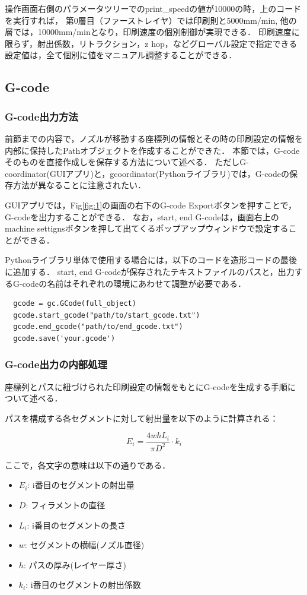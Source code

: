 \documentclass{article}
\begin{document}
\begin{twocolumn}
操作画面右側のパラメータツリーでのprint\_speedの値が10000の時，上のコードを実行すれば，
第0層目（ファーストレイヤ）では印刷則と5000mm/min, 他の層では，10000mm/minとなり，印刷速度の個別制御が実現できる．
印刷速度に限らず，射出係数，リトラクション，z hop，などグローバル設定で指定できる設定値は，全て個別に値をマニュアル調整することができる．

\subsection{G-code}
\subsubsection{G-code出力方法}
\label{sec:GcodeExport}
前節までの内容で，ノズルが移動する座標列の情報とその時の印刷設定の情報を内部に保持したPathオブジェクトを作成することができた．
本節では，G-codeそのものを直接作成しを保存する方法について述べる．
ただしG-coordinator(GUIアプリ)と，gcoordinator(Pythonライブラリ)では，G-codeの保存方法が異なることに注意されたい．

GUIアプリでは，Fig\ref{fig:1}の画面の右下のG-code Exportボタンを押すことで，G-codeを出力することができる．
なお，start, end G-codeは，画面右上のmachine settignsボタンを押して出てくるポップアップウィンドウで設定することができる．

Pythonライブラリ単体で使用する場合には，以下のコードを造形コードの最後に追加する．
start, end G-codeが保存されたテキストファイルのパスと，出力するG-codeの名前はそれぞれの環境にあわせて調整が必要である．
\begin{lstlisting}
  gcode = gc.GCode(full_object)
  gcode.start_gcode("path/to/start_gcode.txt")
  gcode.end_gcode("path/to/end_gcode.txt")
  gcode.save('your.gcode')
\end{lstlisting}

\subsubsection{G-code出力の内部処理}
座標列とパスに紐づけられた印刷設定の情報をもとにG-codeを生成する手順について述べる．

パスを構成する各セグメントに対して射出量を以下のように計算される\cite{akhoundi2020calculating}：

\begin{equation}
  E_{i}=\frac{4 w h L_{i}}{\pi D^{2}} \cdot k_{i}
\end{equation}

ここで，各文字の意味は以下の通りである．
\begin{itemize}
  \item $E_{i}$: i番目のセグメントの射出量
  \item $D$: フィラメントの直径
  \item $L_{i}$: i番目のセグメントの長さ
  \item $w$: セグメントの横幅(ノズル直径)
  \item $h$: パスの厚み(レイヤー厚さ)
  \item $k_{i}$: i番目のセグメントの射出係数
\end{itemize}




\end{twocolumn}
\end{document}

